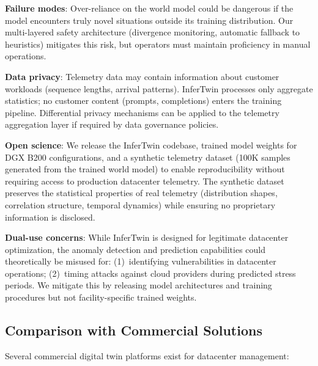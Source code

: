 \documentclass[conference,10pt]{IEEEtran}
\begin{document}
\textbf{Failure modes}: Over-reliance on the world model could be dangerous if the model encounters truly novel situations outside its training distribution. Our multi-layered safety architecture (divergence monitoring, automatic fallback to heuristics) mitigates this risk, but operators must maintain proficiency in manual operations.

\textbf{Data privacy}: Telemetry data may contain information about customer workloads (sequence lengths, arrival patterns). InferTwin processes only aggregate statistics; no customer content (prompts, completions) enters the training pipeline. Differential privacy mechanisms can be applied to the telemetry aggregation layer if required by data governance policies.

\textbf{Open science}: We release the InferTwin codebase, trained model weights for DGX B200 configurations, and a synthetic telemetry dataset (100K samples generated from the trained world model) to enable reproducibility without requiring access to production datacenter telemetry. The synthetic dataset preserves the statistical properties of real telemetry (distribution shapes, correlation structure, temporal dynamics) while ensuring no proprietary information is disclosed.

\textbf{Dual-use concerns}: While InferTwin is designed for legitimate datacenter optimization, the anomaly detection and prediction capabilities could theoretically be misused for: (1)~identifying vulnerabilities in datacenter operations; (2)~timing attacks against cloud providers during predicted stress periods. We mitigate this by releasing model architectures and training procedures but not facility-specific trained weights.

\subsection{Comparison with Commercial Solutions}

Several commercial digital twin platforms exist for datacenter management:
\end{document}
